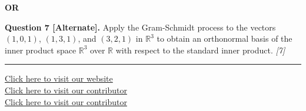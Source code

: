 \documentclass[11pt,a4paper]{article}
\newcommand{\pts}[1]{\hfill   \textit{[#1]}}
\begin{document}
\begin{center}
   \textbf{OR}
\end{center}



\noindent   \textbf{Question 7 [Alternate].} Apply the Gram-Schmidt process to the vectors $(1, 0, 1)$, $(1, 3, 1)$, and $(3, 2, 1)$ in $\mathbb{R}^3$ to obtain an orthonormal basis of the inner product space $\mathbb{R}^3$ over $\mathbb{R}$ with respect to the standard inner product. \pts{7}

\vfill
\rule{\linewidth}{0.4pt}

\begin{center}\small
  \href{https://bhu-exam.vercel.app/}{Click here to visit our website}\\[4pt]
  \href{https://me-aryan.vercel.app/}{Click here to visit our contributor}\\[4pt]
  \href{https://quashan-me.vercel.app/}{Click here to visit our contributor}
\end{center}
\end{document}
